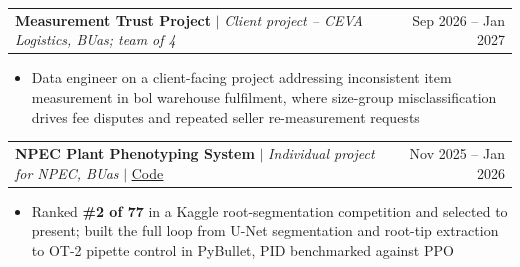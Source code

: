 \documentclass[letterpaper,11pt]{article}
\makeatletter
\newcommand{\resumeItem}[1]{
  \item\small{#1 \vspace{-2pt}}
}
\newcommand{\resumeProjectHeading}[2]{
    \item
    \begin{tabular*}{0.97\textwidth}{l@{\extracolsep{\fill}}r}
      \small#1 & #2 \\
    \end{tabular*}\vspace{-7pt}
}
\newcommand{\resumeItemListStart}{\begin{itemize}}
\newcommand{\resumeItemListEnd}{\end{itemize}\vspace{-5pt}}
\makeatother
\begin{document}
    \resumeProjectHeading
      {\textbf{Measurement Trust Project} $|$ \emph{Client project -- CEVA Logistics, BUas; team of 4}}{Sep 2026 -- Jan 2027}
      \resumeItemListStart
        \resumeItem{Data engineer on a client-facing project addressing inconsistent item measurement in bol warehouse fulfilment, where size-group misclassification drives fee disputes and repeated seller re-measurement requests}
      \resumeItemListEnd

    \resumeProjectHeading
      {\textbf{NPEC Plant Phenotyping System} $|$ \emph{Individual project for NPEC, BUas} $|$ \href{https://github.com/alex-krasnoshtanov/NPEC-Plant-Phenotyping}{\underline{Code}}}{Nov 2025 -- Jan 2026}
      \resumeItemListStart
        \resumeItem{Ranked \textbf{\#2 of 77} in a Kaggle root-segmentation competition and selected to present; built the full loop from U-Net segmentation and root-tip extraction to OT-2 pipette control in PyBullet, PID benchmarked against PPO}
      \resumeItemListEnd
\end{document}

